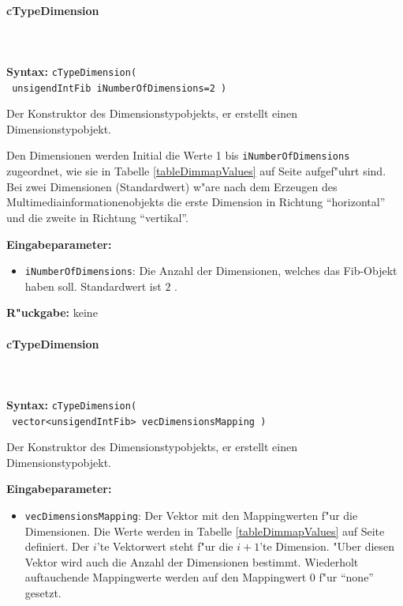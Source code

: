 \paragraph{cTypeDimension}

\ \\\\\noindent
\textbf{Syntax:} \verb|cTypeDimension(| \\\verb| unsigendIntFib iNumberOfDimensions=2 )|

\bigskip\noindent
Der Konstruktor des Dimensionstypobjekts, er erstellt einen Dimensionstypobjekt.

Den Dimensionen werden Initial die Werte 1 bis \verb|iNumberOfDimensions| zugeordnet, wie sie in Tabelle \ref{tableDimmapValues} auf Seite \pageref{tableDimmapValues} aufgef"uhrt sind. Bei zwei Dimensionen (Standardwert) w"are nach dem Erzeugen des Multimediainformationenobjekts die erste Dimension in Richtung ``horizontal'' und die zweite in Richtung ``vertikal''.

\bigskip\noindent
\textbf{Eingabeparameter:}
\begin{itemize}
 \item \verb|iNumberOfDimensions|: Die Anzahl der Dimensionen, welches das Fib-Objekt haben soll. Standardwert ist $2$ .
\end{itemize}

\bigskip\noindent
\textbf{R"uckgabe:} keine


\paragraph{cTypeDimension}

\ \\\\\noindent
\textbf{Syntax:} \verb|cTypeDimension(| \\\verb| vector<unsigendIntFib> vecDimensionsMapping )|

\bigskip\noindent
Der Konstruktor des Dimensionstypobjekts, er erstellt einen Dimensionstypobjekt.

\bigskip\noindent
\textbf{Eingabeparameter:}
\begin{itemize}
 \item \verb|vecDimensionsMapping|: Der Vektor mit den Mappingwerten f"ur die Dimensionen. Die Werte werden in Tabelle \ref{tableDimmapValues} auf Seite \pageref{tableDimmapValues} definiert. Der $i$'te Vektorwert steht f"ur die $i+1$'te Dimension. "Uber diesen Vektor wird auch die Anzahl der Dimensionen bestimmt. Wiederholt auftauchende Mappingwerte werden auf den Mappingwert $0$ f"ur ``none'' gesetzt.
\end{itemize}

